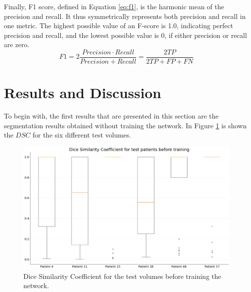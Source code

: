 \documentclass[12pt]{extarticle}
\begin{document}
\noindent Finally, F1 score, defined in Equation \eqref{eq:f1}, is the harmonic mean of the precision and recall. It thus symmetrically represents both precision and recall in one metric. The highest possible value of an F-score is 1.0, indicating perfect precision and recall, and the lowest possible value is 0, if either precision or recall are zero.
\begin{equation}
F1 =2 \dfrac{Precision \cdot Recall}{Precision+Recall}=\dfrac{2TP}{2TP+FP+FN}
\label{eq:f1}
\end{equation}

\section{Results and Discussion}\label{sec:results}
To begin with, the first results that are presented in this section are the segmentation results obtained without training the network. 
In Figure \ref{fig:DSC_beforeTraining} is shown the $DSC$ for the six different test volumes.
\begin{figure}[h!]
\centering
\includegraphics[width = \textwidth]{DSC_beforeTraining.png}
\caption{Dice Similarity Coefficient for the test volumes before training the network.}
\label{fig:DSC_beforeTraining}
\end{figure}
\end{document}
